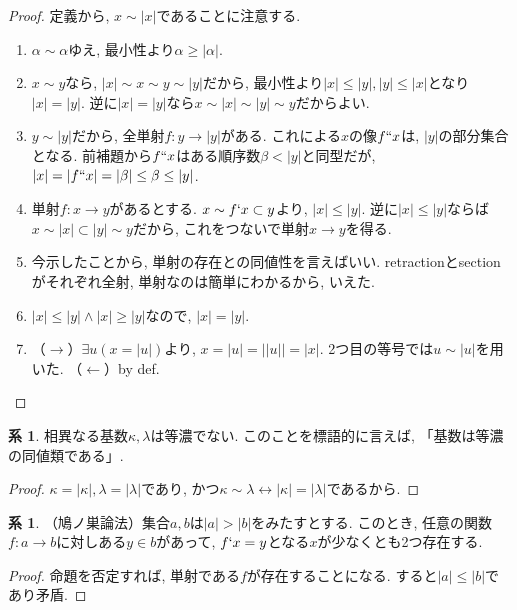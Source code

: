 \documentclass[a4paper, twoside]{bxjsarticle}
\newcommand{\abs}[1]{\left\lvert#1\right\rvert}
\theoremstyle{definition}
\newtheorem{cor}[thm]{系}
\begin{document}
        \begin{proof}
            定義から, $x \sim \abs{x}$であることに注意する.
            \begin{enumerate}
                \item $\alpha\sim\alpha$ゆえ, 最小性より$\alpha\geq\abs{\alpha}$.
                \item $x \sim y$なら, $\abs{x}\sim x\sim y\sim \abs{y}$だから, 最小性より$\abs{x}\leq\abs{y}, \abs{y}\leq\abs{x}$となり$\abs{x}=\abs{y}$. 逆に$\abs{x}=\abs{y}$なら$x\sim \abs{x}\sim \abs{y}\sim y$だからよい.
                \item $y\sim \abs{y}$だから, 全単射$f\colon y\to\abs{y}$がある. これによる$x$の像$f``x$は, $\abs{y}$の部分集合となる. 前補題から$f``x$はある順序数$\beta<\abs{y}$と同型だが, $\abs{x}=\abs{f``x}=\abs{\beta}\leq\beta\leq\abs{y}$.
                \item 単射$f\colon x\to y$があるとする. $x\sim f`x\subset y$より, $\abs{x}\leq\abs{y}$. 逆に$\abs{x}\leq\abs{y}$ならば$x\sim\abs{x}\subset\abs{y}\sim y$だから, これをつないで単射$x\to y$を得る.
                \item 今示したことから, 単射の存在との同値性を言えばいい. retractionとsectionがそれぞれ全射, 単射なのは簡単にわかるから, いえた.
                \item $\abs{x}\leq\abs{y}\land\abs{x}\geq\abs{y}$なので, $\abs{x}=\abs{y}$.
                \item （$\rightarrow$）$\exists u(x=\abs{u})$より, $x=\abs{u}=\abs{\abs{u}}=\abs{x}$. 2つ目の等号では$u\sim\abs{u}$を用いた. （$\leftarrow$）by def.
            \end{enumerate}
        \end{proof}
        \begin{cor}
            相異なる基数$\kappa, \lambda$は等濃でない. このことを標語的に言えば, 「基数は等濃の同値類である」.
        \end{cor}
        \begin{proof}
            $\kappa=\abs{\kappa}, \lambda=\abs{\lambda}$であり, かつ$\kappa \sim \lambda\leftrightarrow\abs{\kappa}=\abs{\lambda}$であるから.
        \end{proof}
        \begin{cor}
            （鳩ノ巣論法）集合$a, b$は$\abs{a}>\abs{b}$をみたすとする. このとき, 任意の関数$f\colon a\to b$に対しある$y\in b$があって, $f`x=y$となる$x$が少なくとも2つ存在する.
        \end{cor}
        \begin{proof}
            命題を否定すれば, 単射である$f$が存在することになる. すると$\abs{a}\leq\abs{b}$であり矛盾.
        \end{proof}
\end{document}
